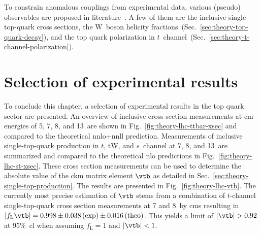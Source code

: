 To constrain anomalous couplings from experimental data, various (pseudo) observables are proposed in literature~\cite{AguilarSaavedra:2010nx,Aguilar-Saavedra:2014eqa,Bernreuther:2015yna}. A few of them are the inclusive single-top-quark cross sections, the W~boson helicity fractions~(Sec.~\ref{sec:theory-top-quark-decay}), and the top quark polarization in $t$~channel~(Sec.~\ref{sec:theory-t-channel-polarization}).


\section{Selection of experimental results}
\label{sec:theory-exp-results}


To conclude this chapter, a selection of experimental results in the top quark sector are presented. An overview of inclusive \ttbar cross section measurements at \acrlong{cm} energies of 5, 7, 8, and 13~\TeV are shown in Fig.~\ref{fig:theory-lhc-ttbar-xsec} and compared to the theoretical \gls{nnlo}+\gls{nnll} prediction. Measurements of inclusive single-top-quark production in $t$, tW, and $s$~channel at 7, 8, and 13~\TeV are summarized and compared to the theoretical \gls{nlo} predictions in Fig.~\ref{fig:theory-lhc-st-xsec}. These cross section measurements can be used to determine the absolute value of the \gls{ckm} matrix element $\vtb$ as detailed in Sec.~\ref{sec:theory-single-top-production}. The results are presented in Fig.~\ref{fig:theory-lhc-vtb}. The currently most precise estimation of $\vtb$ stems from a combination of $t$-channel single-top-quark cross section measurements at 7 and 8~\TeV by \gls{cms} resulting in $|f_\mathrm{L}\vtb|=0.998\pm0.038\,\mathrm{(exp)}\pm0.016\,\mathrm{(theo)}$. This yields a limit of $|\vtb|>0.92$ at 95\%~\gls{cl} when assuming $f_\mathrm{L}=1$ and $|\vtb|<1$.


